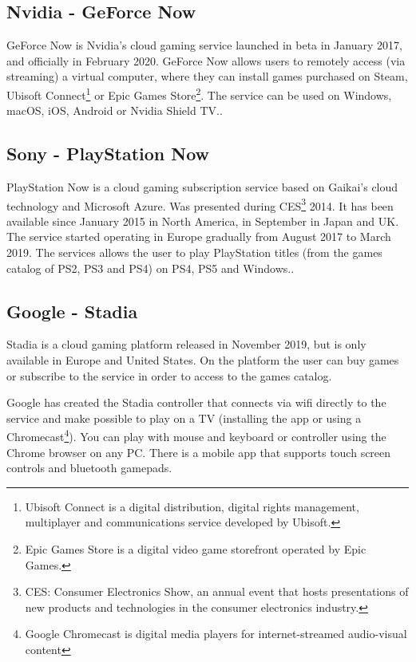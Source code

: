 \subsection{Nvidia - GeForce Now}
GeForce Now is Nvidia's cloud gaming service launched in beta in January 2017, and officially in February 2020. GeForce Now allows users to remotely access (via streaming) a virtual computer, where they can install games purchased on Steam, Ubisoft Connect\footnote{Ubisoft Connect is a digital distribution, digital rights management, multiplayer and communications service developed by Ubisoft.} or Epic Games Store\footnote{Epic Games Store is a digital video game storefront operated by Epic Games.}. The service can be used on Windows, macOS, iOS, Android or Nvidia Shield TV.\cite{GeForce_Now}.

\subsection{Sony - PlayStation Now}
PlayStation Now is a cloud gaming subscription service based on Gaikai's cloud technology and Microsoft Azure. Was presented during CES\footnote{CES: Consumer Electronics Show, an annual event that hosts presentations of new products and technologies in the consumer electronics industry.} 2014. It has been available since January 2015 in North America, in September in Japan and UK. The service started operating in Europe gradually from August 2017 to March 2019. The services allows the user to play PlayStation titles (from the games catalog of PS2, PS3 and PS4) on PS4, PS5 and Windows.\cite{PlayStation_Now}.

\subsection{Google - Stadia}
Stadia is a cloud gaming platform released in November 2019, but is only available in Europe and United States. On the platform the user can buy games or subscribe to the service in order to access to the games catalog.

Google has created the Stadia controller that connects via wifi directly to the service and make possible to play on a TV (installing the app or using a Chromecast\footnote{Google Chromecast is digital media players for internet-streamed audio-visual content}). You can play with mouse and keyboard or controller using the Chrome browser on any PC. There is a mobile app that supports touch screen controls and bluetooth gamepads.

